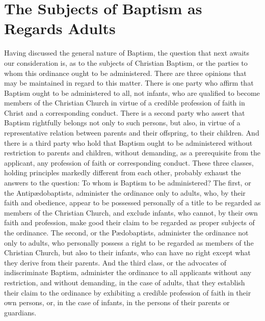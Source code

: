 \documentclass[
  english,
]{book}
\begin{document}
\hypertarget{the-subjects-of-baptism-as-regards-adults}{%
\section{The Subjects of Baptism as Regards Adults}\label{the-subjects-of-baptism-as-regards-adults}}

Having discussed the general nature of Baptism, the question that next awaits our consideration is, as to the subjects of Christian Baptism, or the parties to whom this ordinance ought to be administered. There are three opinions that may be maintained in regard to this matter. There is one party who affirm that Baptism ought to be administered to all, not infants, who are qualified to become members of the Christian Church in virtue of a credible profession of faith in Christ and a corresponding conduct. There is a second party who assert that Baptism rightfully belongs not only to such persons, but also, in virtue of a representative relation between parents and their offspring, to their children. And there is a third party who hold that Baptism ought to be administered without restriction to parents and children, without demanding, as a prerequisite from the applicant, any profession of faith or corresponding conduct. These three classes, holding principles markedly different from each other, probably exhaust the answers to the question: To whom is Baptism to be administered? The first, or the Antipædobaptists, administer the ordinance only to adults, who, by their faith and obedience, appear to be possessed personally of a title to be regarded as members of the Christian Church, and exclude infants, who cannot, by their own faith and profession, make good their claim to be regarded as proper subjects of the ordinance. The second, or the Pædobaptists, administer the ordinance not only to adults, who personally possess a right to be regarded as members of the Christian Church, but also to their infants, who can have no right except what they derive from their parents. And the third class, or the advocates of indiscriminate Baptism, administer the ordinance to all applicants without any restriction, and without demanding, in the case of adults, that they establish their claim to the ordinance by exhibiting a credible profession of faith in their own persons, or, in the case of infants, in the persons of their parents or guardians.
\end{document}

